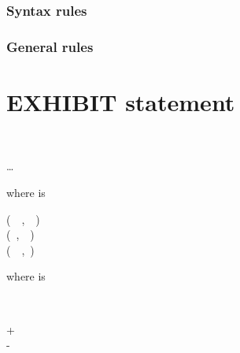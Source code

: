 \subsubsection{Syntax rules}

\subsubsection{General rules}

\section{EXHIBIT statement}


\begin{syntax}[\miscextcolour]
  \begin{0-1}
  \end{0-1}
  \begin{0-1}
  \end{0-1}
  \begin{0-1}
  \end{0-1}

  \begin{1=}
    \literal \\
    \identifier
  \end{1=}\ldots

\end{syntax}

where  is

\begin{syntax}[\miscextcolour]
  \begin{1=}
    (\ \ ,\ \ ) \\
    (\ ,\ \ ) \\
    (\ \ ,\ )
  \end{1=}
\end{syntax}

where  is

\begin{syntax}[\miscextcolour]
  \begin{1=}
    \identifier \\
    \literal
  \end{1=}
  \begin{0-1}
    \begin{1=}
      + \\
      -
    \end{1=}
    \literal
  \end{0-1}
\end{syntax}


